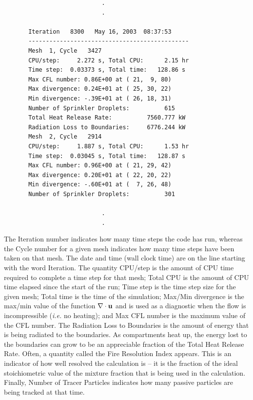 \documentclass[11pt]{book}
\newcommand{\bu}{{\bf u}}
\begin{document}
\footnotesize
\begin{verbatim}
                            .
                            .

       Iteration   8300   May 16, 2003  08:37:53
       ----------------------------------------------
       Mesh  1, Cycle   3427
       CPU/step:     2.272 s, Total CPU:      2.15 hr
       Time step:  0.03373 s, Total time:   128.86 s
       Max CFL number: 0.86E+00 at ( 21,  9, 80)
       Max divergence: 0.24E+01 at ( 25, 30, 22)
       Min divergence: -.39E+01 at ( 26, 18, 31)
       Number of Sprinkler Droplets:          615
       Total Heat Release Rate:          7560.777 kW
       Radiation Loss to Boundaries:     6776.244 kW
       Mesh  2, Cycle   2914
       CPU/step:     1.887 s, Total CPU:      1.53 hr
       Time step:  0.03045 s, Total time:   128.87 s
       Max CFL number: 0.96E+00 at ( 21, 29, 42)
       Max divergence: 0.20E+01 at ( 22, 20, 22)
       Min divergence: -.60E+01 at (  7, 26, 48)
       Number of Sprinkler Droplets:          301

                            .
                            .
\end{verbatim}
\normalsize
The Iteration number indicates how many time steps the code has run, whereas the
Cycle number for a given mesh indicates how many time steps have been taken on that
mesh. The date and time (wall clock time) are on the line starting with the word
Iteration. The quantity {\ct CPU/step} is the amount of CPU time required to complete
a time step for that mesh; {\ct Total CPU} is the amount of CPU time elapsed since the
start of the run; {\ct Time step} is the time step size for the given mesh;
{\ct Total time} is the time of the simulation;
{\ct Max/Min divergence} is the max/min value of the
function $\nabla \cdot \bu$ and is used as a diagnostic when the flow
is incompressible ({\em i.e.} no heating); and {\ct Max CFL number} is the
maximum value of the CFL number. The {\ct Radiation Loss to Boundaries} is the
amount of energy that is being radiated to the boundaries. As compartments
heat up, the energy lost to the boundaries can grow to be an appreciable
fraction of the {\ct Total Heat Release Rate}.
Often, a quantity called the {\ct Fire Resolution Index}
appears. This is an indicator of how well
resolved the calculation is -- it is the fraction of the ideal
stoichiometric value of the mixture fraction that is being used in
the calculation. Finally, {\ct Number of Tracer Particles} indicates
how many passive particles are being tracked at that time.
\end{document}
